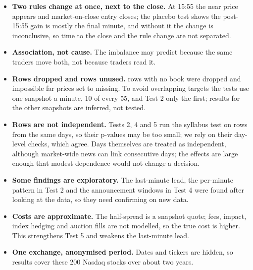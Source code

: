 \documentclass[10pt,a4paper,twocolumn]{article}
\begin{document}
\begin{itemize}
  \item \textbf{Two rules change at once, next to the close.} At 15:55 the near price appears and market-on-close
  entry closes; the placebo test shows the post-15:55 gain is mostly the final minute, and without it the change is
  inconclusive, so time to the close and the rule change are not separated.
  \item \textbf{Association, not cause.} The imbalance may predict because the same traders move both, not because
  traders read it.
  \item \textbf{Rows dropped and rows unused.} \nEmptyRows{} rows with no book were dropped and \nFarOutliers{}
  impossible far prices set to missing. To avoid overlapping targets the tests use one snapshot a minute, 10 of every
  55, and Test 2 only the first; results for the other snapshots are inferred, not tested.
  \item \textbf{Rows are not independent.} Tests 2, 4 and 5 run the syllabus test on rows from the same days, so
  their p-values may be too small; we rely on their day-level checks, which agree. Days themselves are treated as
  independent, although market-wide news can link consecutive days; the effects are large enough that modest
  dependence would not change a decision.
  \item \textbf{Some findings are exploratory.} The last-minute lead, the per-minute pattern in Test 2 and the
  announcement windows in Test 4 were found after looking at the data, so they need confirming on new data.
  \item \textbf{Costs are approximate.} The half-spread is a snapshot quote; fees, impact, index hedging and auction
  fills are not modelled, so the true cost is higher. This strengthens Test 5 and weakens the last-minute lead.
  \item \textbf{One exchange, anonymised period.} Dates and tickers are hidden, so results cover these 200 Nasdaq
  stocks over about two years.
\end{itemize}
\end{document}
